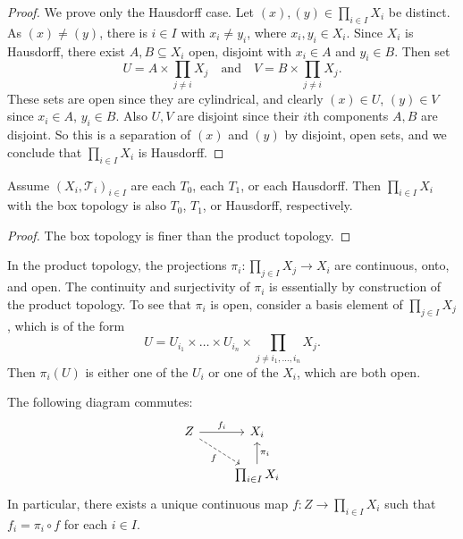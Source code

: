 \begin{proof}
  We prove only the Hausdorff case. Let
  $(x), (y) \in \prod_{i \in I} X_i$ be distinct.
  As $(x) \ne (y)$, there is $i \in I$
  with $x_i \ne y_i$, where $x_i, y_i \in X_i$.
  Since $X_i$ is Hausdorff, there exist
  $A, B \subseteq X_i$ open, disjoint
  with $x_i \in A$ and $y_i \in B$.
  Then set
  \[
    U = A \times \prod_{j \ne i} X_j \quad \text{and} \quad
    V = B \times \prod_{j \ne i} X_j.
  \]
  These sets are open since they are cylindrical,
  and clearly $(x) \in U$, $(y) \in V$ since
  $x_i \in A$, $y_i \in B$. Also $U, V$ are
  disjoint since their $i$th components $A, B$
  are disjoint. So this is a separation of
  $(x)$ and $(y)$ by disjoint, open sets, and
  we conclude that $\prod_{i \in I} X_i$ is Hausdorff.
\end{proof}

\begin{corollary}
  Assume $(X_i, \mathcal{T}_i)_{i \in I}$ are each
  $T_0$, each $T_1$, or each Hausdorff. Then
  $\prod_{i \in I} X_i$ with the
  box topology is also $T_0$, $T_1$,
  or Hausdorff, respectively.
\end{corollary}

\begin{proof}
  The box topology is finer than the product topology.
\end{proof}

\begin{remark}
  In the product topology, the
  projections $\pi_i : \prod_{j \in I} X_j \to X_i$
  are continuous, onto, and open.
  The continuity and surjectivity of $\pi_i$ is
  essentially by construction of the product topology.
  To see that $\pi_i$ is open, consider a basis
  element of $\prod_{j \in I} X_j$, which is of the form
  \[
    U = U_{i_1} \times \dots \times U_{i_n}
    \times \prod_{j \ne i_1, \dots, i_n} X_j.
  \]
  Then $\pi_i(U)$ is either one of the
  $U_{i}$ or one of the $X_i$, which are both open.
\end{remark}

\begin{theorem}
  The following diagram commutes:
  \[
    \begin{tikzcd}
      Z \ar[r, "f_i"] \ar[dr, "f", swap, dashed] & X_i \\
       & \prod_{i \in I} X_i \ar[u, "\pi_i"']
    \end{tikzcd}
  \]
  In particular, there exists a unique continuous
  map $f : Z \to \prod_{i \in I} X_i$ such that
  $f_i = \pi_i \circ f$ for each $i \in I$.
\end{theorem}

